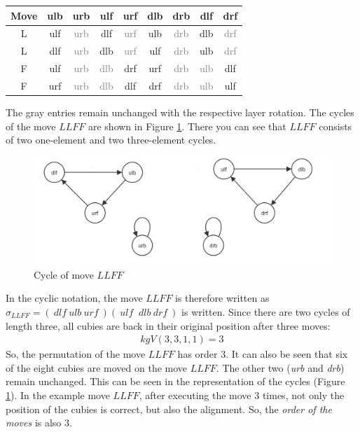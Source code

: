 \documentclass[12pt,a4paper]{article}
\theoremstyle{custom}
\begin{document}
\begin{center}
\begin{tabular}{ccccccccc}
\toprule
\textbf{Move} & \textbf{ulb} & \textbf{urb} & \textbf{ulf} & \textbf{urf} & \textbf{dlb} & \textbf{drb} & \textbf{dlf} & \textbf{drf} \\
\midrule

L & ulf & \textcolor{gray}{urb} & dlf & \textcolor{gray}{urf} & ulb & \textcolor{gray}{drb} & dlb & \textcolor{gray}{drf} \\

L & dlf & \textcolor{gray}{urb} & dlb & \textcolor{gray}{urf} & ulf & \textcolor{gray}{drb} & ulb & \textcolor{gray}{drf} \\

F & ulf & \textcolor{gray}{urb} & \textcolor{gray}{dlb} & drf & urf & \textcolor{gray}{drb} & \textcolor{gray}{ulb} & dlf \\

F & urf & \textcolor{gray}{urb} & \textcolor{gray}{dlb} & dlf & drf & \textcolor{gray}{drb} & \textcolor{gray}{ulb} & ulf \\
\bottomrule
\end{tabular}
\end{center}
The gray entries remain unchanged with the respective layer rotation.\newpage
The cycles of the move $LLFF$ are shown in Figure \ref{CycleOfLLFF}. There you can see that $LLFF$ consists of two one-element and two three-element cycles.
\begin{figure}[H]
\centering
\includegraphics[scale=0.3]{cycle_LLFF.png}
\caption[Cycle of move $LLFF$]{Cycle of move $LLFF$}
\label{CycleOfLLFF}
\end{figure}
In the cyclic notation, the move $LLFF$ is therefore written as $\sigma_{LLFF}=( \ \textit{dlf} \ \textit{ulb} \ \textit{urf}\ )(\ \textit{ulf} \ \textit{ dlb} \ \textit{drf} \ )$ is written.
Since there are two cycles of length three, all cubies are back in their original position after three moves:
\begin{align*}
kgV(3,3,1,1)=3
\end{align*}
So, the permutation of the move $LLFF$ has order $3$.
It can also be seen that six of the eight cubies are moved on the move $LLFF$. The other two (\textit{urb} and \textit{drb}) remain unchanged. This can be seen in the representation of the cycles (Figure \ref{CycleOfLLFF}).
In the example move $LLFF$, after executing the move $3$ times, not only the position of the cubies is correct, but also the alignment. So, the \textit{order of the moves} is also 3. 
\end{document}
